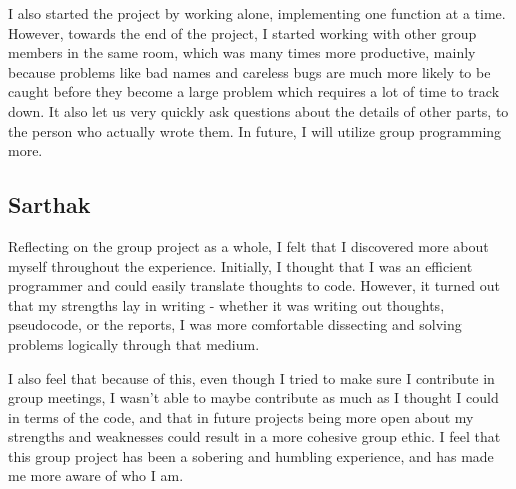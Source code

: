 \documentclass[a4paper]{article}
\begin{document}
I also started the project by working alone, implementing one function at a time. However, towards the end of the project, I started working with other group members in the same room, which was many times more productive, mainly because problems like bad names and careless bugs are much more likely to be caught before they become a large problem which requires a lot of time to track down. It also let us very quickly ask questions about the details of other parts, to the person who actually wrote them. In future, I will utilize group programming more.

\subsection{Sarthak}

Reflecting on the group project as a whole, I felt that I discovered more about myself throughout the experience. Initially, I thought that I was an efficient programmer and could easily translate thoughts to code. However, it turned out that my strengths lay in writing - whether it was writing out thoughts, pseudocode, or the reports, I was more comfortable dissecting and solving problems logically through that medium. 

I also feel that because of this, even though I tried to make sure I contribute in group meetings, I wasn’t able to maybe contribute as much as I thought I could in terms of the code, and that in future projects being more open about my strengths and weaknesses could result in a more cohesive group ethic. I feel that this group project has been a sobering and humbling experience, and has made me more aware of who I am.
\end{document}
